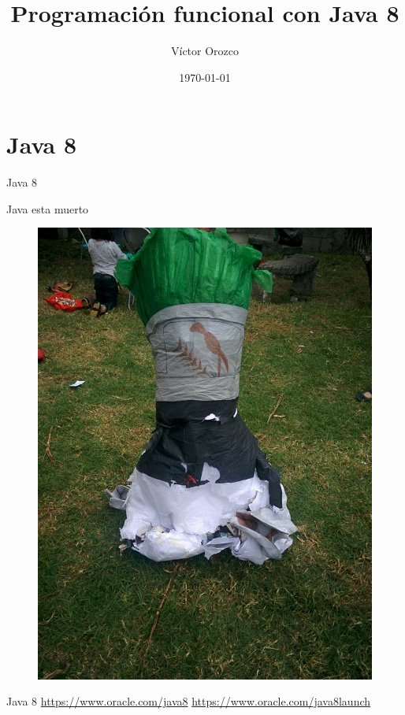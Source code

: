 \documentclass{beamer}
\title{Programación funcional con Java 8}
\author{Víctor Orozco}
\institute{Nabenik}
\date{\today}
\begin{document}
\frame{\titlepage}

\section{Java 8}
\begin{frame}
\huge Java 8
\end{frame}

\begin{frame}{Java esta muerto}
\begin{figure}
	\centering
	\includegraphics[width=0.5\linewidth]{Images/dukedead.jpg}
\end{figure}
\end{frame}

\begin{frame}{Java 8}
\href{https://www.oracle.com/java8}{https://www.oracle.com/java8}
\href{https://www.oracle.com/java8launch}{https://www.oracle.com/java8launch}
\end{frame}
\end{document}
